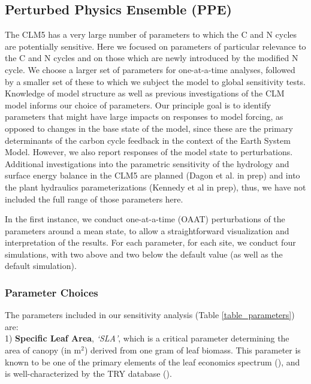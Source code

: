 \documentclass[draft,linenumbers]{agujournal}
\begin{document}
\subsection{Perturbed Physics Ensemble (PPE)}

The CLM5 has a very large number of parameters to which the C and N cycles are potentially sensitive. Here we focused on parameters of particular relevance to the C and N cycles and on those which are newly introduced by the modified N cycle. We choose a larger set of parameters for one-at-a-time analyses, followed by a smaller set of these to which we subject the model to global sensitivity tests. Knowledge of model structure as well as previous investigations of the CLM model informs our choice of parameters. Our principle goal is to identify parameters that might have large impacts on responses to model forcing, as opposed to changes in the base state of the model, since these are the primary determinants of the carbon cycle feedback in the context of the Earth System Model. However, we also report responses of the model state to perturbations. Additional investigations into the parametric sensitivity of the hydrology and surface energy balance in the CLM5 are planned (Dagon et al. in prep) and into the plant hydraulics parameterizations (Kennedy et al in prep), thus, we have not included the full range of those parameters here.

In the first instance, we conduct one-at-a-time (OAAT) perturbations of the parameters around a mean state, to allow a straightforward visualization and interpretation of the results. For each parameter, for each site, we conduct four simulations, with two above and two below the default value (as well as the default simulation).


\subsubsection{Parameter Choices}

The parameters included in our sensitivity analysis (Table \ref{table_parameters}) are: \\

1) \textbf{Specific Leaf Area}, \emph{`SLA'}, which is a critical parameter determining the area of canopy (in m$^{2}$) derived from one gram of leaf biomass. This parameter is known to be one of the primary elements of the leaf economics spectrum (\cite{wright2004}), and is well-characterized by the TRY database (\cite{kattge2011}).\\
\end{document}
